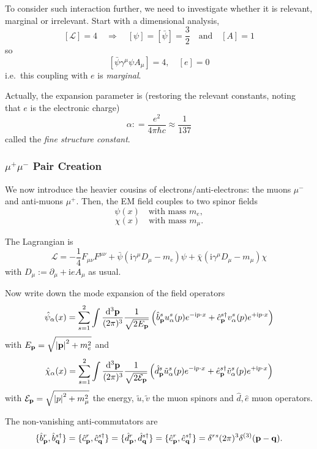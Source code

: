\documentclass[a4paper,11pt]{article}
\begin{document}
	To consider such interaction further, we need to investigate whether it is relevant, marginal or irrelevant. Start with a dimensional analysis, 
	\[
		[\mathcal{L}] = 4 \quad \Rightarrow \quad [\psi] = [\bar \psi] = \frac{3}{2} \quad \text{and} \quad [A] = 1
	\]
	so 
	\[
		[\bar \psi \gamma^\mu \psi A_\mu] = 4, \quad [e] = 0
	\]
	i.e.\ this coupling with $e$ is \emph{marginal}.

	Actually, the expansion parameter is (restoring the relevant constants, noting that $e$ is the electronic charge)
	\[
		\alpha : = \frac{e^2}{4 \pi \hbar c} \approx \frac{1}{137}
	\]
	called the \emph{fine structure constant}.

	\subsubsection{$\mu^+ \mu^-$ Pair Creation}
	We now introduce the heavier cousins of electrons/anti-electrons: the muons $\mu^-$ and anti-muons $\mu^+$. Then, the EM field couples to two spinor fields
	\[
		\psi(x) \quad \text{with mass } m_e,
	\]
	\[
		\chi(x) \quad \text{with mass } m_\mu.
	\]
	
	The Lagrangian is 
	\[
		\mathcal{L} = - \frac{1}{4} F _{\mu \nu} F ^{\mu \nu} + \bar \psi (\mathrm{i} \gamma^\mu D_\mu - m_e) \psi + \bar \chi (\mathrm{i} \gamma^\mu D_\mu - m_\mu) \chi
	\]
	with $D_\mu := \partial_\mu + \mathrm{i} e A_\mu$ as usual.
	
	Now write down the mode expansion of the field operators
	\[
		\hat \psi_\alpha(x) = \sum _{s = 1}^2 \int \frac{\dd[3]{\vb p}}{(2\pi)^{3}} \frac{1}{\sqrt{2 E _{\vb p}}} \left( \hat b^s_{\vb p} u^s_\alpha(p) e ^{- \mathrm{i} p \cdot x} + \hat c^{s\dagger}_{\vb p} v^s_\alpha(p) e ^{+ \mathrm{i} p \cdot x} \right)
	\]
	with $E _{\vb p} = \sqrt{\abs{\vb p}^2 + m_e^2}$ and
	\[
		\hat \chi_\alpha(x) = \sum _{s = 1}^2 \int \frac{\dd[3]{\vb p}}{(2\pi)^{3}} \frac{1}{\sqrt{2 \mathcal{E} _{\vb p}}} \left( \hat d^s_{\vb p} \tilde u^s_\alpha(p) e ^{- \mathrm{i} p \cdot x} + \hat e^{s\dagger}_{\vb p} \tilde v^s_\alpha(p) e ^{+ \mathrm{i} p \cdot x} \right)
	\]
	with $\mathcal{E}_{\vb p} = \sqrt{\abs{p}^2 + m_\mu^2}$ the energy, $\tilde u, \tilde v$ the muon spinors and $\hat d, \hat e$ muon operators.

	The non-vanishing anti-commutators are
	\[
		\{\hat b^r _{\vb p}, \hat b ^{s\dagger}_{\vb q}\} = \{\hat c^r _{\vb p}, \hat c ^{s\dagger}_{\vb q}\} = \{\hat d^r _{\vb p}, \hat d ^{s\dagger}_{\vb q}\} = \{\hat e^r _{\vb p}, \hat e ^{s\dagger}_{\vb q}\} = \delta ^{rs} (2 \pi)^3 \delta ^{(3)}(\vb p - \vb q).
	\]
	
\end{document}
